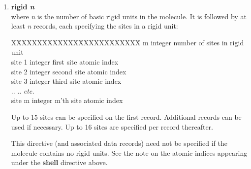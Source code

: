 \begin{enumerate}
{\bf Note} that if a site weighting is not supplied \D will assume
it is zero.  However, \D detects that all sites in a PMF unit have
zero weighting then the PMF unit sites will be assigned the masses
of the original atomic sites.

The PMF bondlength applies to the distance between the centres of the
two PMF units.  The centre, $\vec{R}_{i}$, of each unit is given by
\begin{equation}
\vek{R}_{i}~=~\frac{\sum_{j=1}^{n_{i}} w_{j}~\vec{r}_{j}}{\sum_{j=1}^{n_{j}} w_{j}}~~,
\end{equation}
where $r_{j}$ is a site position and $w_{j}$ the site weighting.

{\bf Note} that the PMF constraint is intramolecular.  To define
a constraint between two molecules, the molecules must be described as
part of the same \D ``molecule''.  \D allows only one type of PMF
constraint per system.  The value of nummols for this molecule
determines the number of PMF constraint in the system.

{\bf Note} that in \D PMF constraints are handeled in every available
ensemble.

\item{\bf rigid {\em n}}\\
where {\em n} is the number of basic rigid units in the molecule.  It is
followed by at least {\em n} records, each specifying the sites in a rigid
unit:
\begin{tabbing}
X\=XXXXXXXXXXXX\=XXXXXXXXXXXX\=\kill
\> m      \> integer \> number of sites in rigid unit \\
\> site 1 \> integer \> first site atomic index \\
\> site 2 \> integer \> second site atomic index \\
\> site 3 \> integer \> third site atomic index \\
\> .. \> .. \> {\em etc.} \\
\> site m \> integer \> m'th site atomic index
\end{tabbing}
Up to 15 sites can be specified on the first record.  Additional records
can be used if necessary.  Up to 16 sites are specified per record thereafter.

This directive (and associated data records) need not be specified if the
molecule contains no rigid units.  See the note on the atomic indices
appearing under the {\bf shell} directive above.


\end{enumerate}
